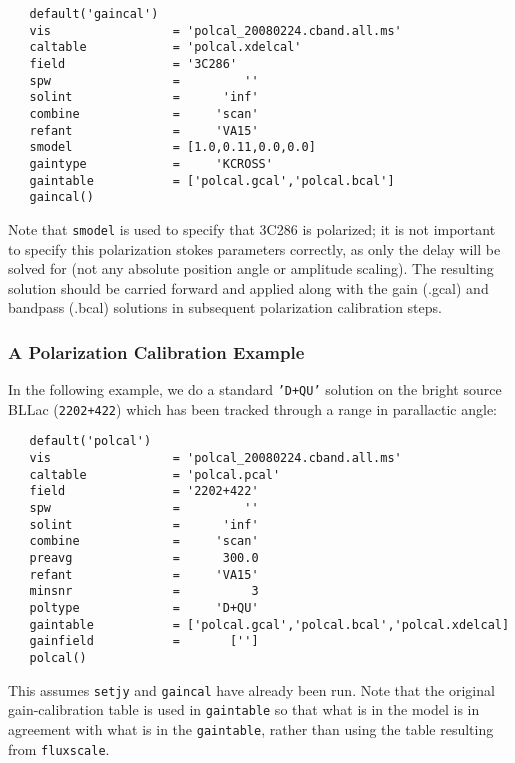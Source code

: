 \small
\begin{verbatim}
   default('gaincal')
   vis                 = 'polcal_20080224.cband.all.ms'
   caltable            = 'polcal.xdelcal'
   field               = '3C286'        
   spw                 =         ''        
   solint              =      'inf'    
   combine             =     'scan' 
   refant              =     'VA15'
   smodel              = [1.0,0.11,0.0,0.0]        
   gaintype            =     'KCROSS'        
   gaintable           = ['polcal.gcal','polcal.bcal']
   gaincal()
\end{verbatim}
\normalsize

Note that {\tt smodel} is used to specify that 3C286 is polarized; it is not
important to specify this polarization stokes parameters correctly, as only 
the delay will be solved for (not any absolute position angle or amplitude 
scaling).  The resulting solution should be carried forward and applied 
along with the gain (.gcal) and
bandpass (.bcal) solutions in subsequent polarization calibration steps.


\subsubsection{A Polarization Calibration Example}
\label{section:cal.solve.pol.example}

In the following example, we do a standard {\tt 'D+QU'} solution on
the bright source BLLac ({\tt 2202+422}) which has been tracked
through a range in parallactic angle:
\small
\begin{verbatim}
   default('polcal')
   vis                 = 'polcal_20080224.cband.all.ms'
   caltable            = 'polcal.pcal'
   field               = '2202+422'        
   spw                 =         ''        
   solint              =      'inf'    
   combine             =     'scan' 
   preavg              =      300.0        
   refant              =     'VA15'        
   minsnr              =          3        
   poltype             =     'D+QU'        
   gaintable           = ['polcal.gcal','polcal.bcal','polcal.xdelcal]
   gainfield           =       ['']
   polcal()
\end{verbatim}
\normalsize This assumes {\tt setjy} and {\tt gaincal} have already
been run.  Note that the original gain-calibration table is used in
{\tt gaintable} so that what is in the model is in agreement with what
is in the {\tt gaintable}, rather than using the table resulting from
{\tt fluxscale}.

